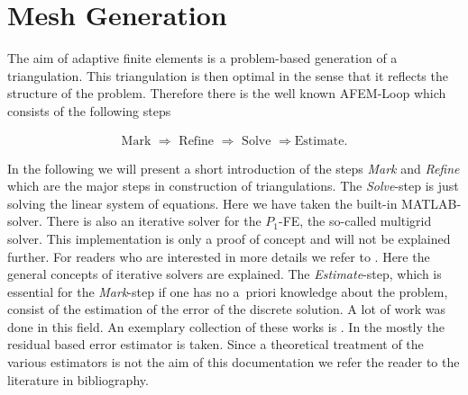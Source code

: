 \section{Mesh Generation}
\label{sect:MeshGeneration}

\noindent The aim of adaptive finite elements is a problem-based generation of a triangulation. This triangulation is then optimal in the sense that it reflects the structure of the problem. Therefore there is the well known AFEM-Loop which consists of the following steps

\begin{align*}
\text{Mark }\Longrightarrow\text{ Refine }\Longrightarrow\text{ Solve }\Longrightarrow\text{Estimate}.
\end{align*}

\noindent In the following we will present a short introduction of the steps \textit{Mark} and \textit{Refine} which are the major steps in construction of triangulations. The \textit{Solve}-step is just solving the linear system of equations. Here we have taken the built-in MATLAB-solver. There is also an iterative solver for the $P_1$-FE, the so-called multigrid solver. This implementation is only a proof of concept and will not be explained further. For readers who are interested in more details we refer to \cite{Bra,HaFaIo}. Here the general concepts of iterative solvers are explained. The \textit{Estimate}-step, which is essential for the \textit{Mark}-step if one has no a~priori knowledge about the problem, consist of the estimation of the error of the discrete solution. A lot of work was done in this field. An exemplary collection of these works is \cite{Brandts,BrCC,CC1,CC2,CC2004,CCFu,CCFu2,CCHo1,CCHo2,Ver}. In the \FFW mostly the residual based error estimator is taken. Since a theoretical treatment of the various estimators is not the aim of this documentation we refer the reader to the literature in bibliography.






